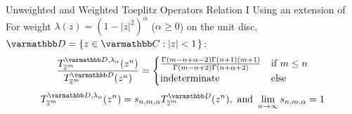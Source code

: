 \documentclass{reu_beamer}
\begin{document}
\begin{frame}{Unweighted and Weighted Toeplitz Operators Relation I}
    Using an extension of \cite[Lemma 2.1]{AshleyAdenCelikDanielLuke2024}
    \newline\newline
    For weight $\lambda(z)=\left(1-|z|^2\right)^\alpha$ ($\alpha \geq 0$) on the unit disc, \(\mathbb{D} = \crl{z \in \C: \left |z| < 1\right.}\):
        \[
        \frac{T^{\disc, \lambda_\alpha}_{\overline{z}^m}(z^n)}{T^{\mathbb{D}}_{\overline{z}^m}(z^n)} =
        \begin{cases}
            \frac{\Gamma(m-n+\alpha-2)\Gamma(n+1)(m+1)}{\Gamma(m-n+2)\Gamma(n+\alpha+2)}&\text{if}\ m \leq n \\
            \text{indeterminate} &\text{else}
        \end{cases}
    \] 
    \newline
    \[T^{\disc, \lambda_\alpha}_{\overline{z}^m}(z^n)=s_{n,m,\alpha}T^{\disc}_{\overline{z}^m}(z^n),\text{ and }\limit{n}{\infty}s_{n,m,\alpha}=1\]
\end{frame}
\end{document}
